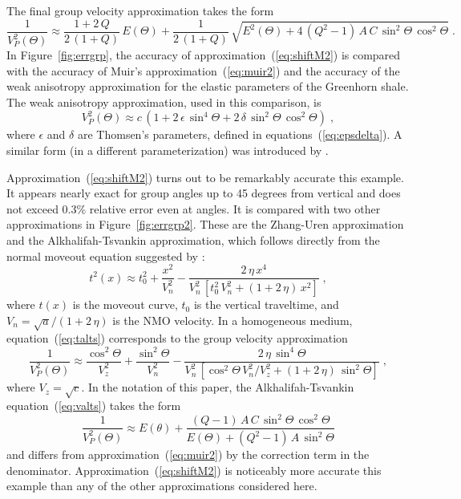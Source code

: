 The final group velocity approximation takes the form
\begin{equation}
  \label{eq:shiftM2}
  \frac{1}{V^2_{P}(\Theta)} \approx \frac{1+2\,Q}{2\,(1+Q)}\,E(\Theta) + 
\frac{1}{2\,(1+Q)}\,
\sqrt{E^2(\Theta) + 4\,(Q^2-1)\,A\,C\,\sin^2{\Theta}\,\cos^2{\Theta}}\;.
\end{equation}
In Figure~\ref{fig:errgrp}, the accuracy of approximation~(\ref{eq:shiftM2})
is compared with the accuracy of Muir's approximation~(\ref{eq:muir2}) and the
accuracy of the weak anisotropy approximation \cite[]{GEO51-10-19541966} for the
elastic parameters of the Greenhorn shale. The weak anisotropy approximation,
used in this comparison, is
\begin{equation}
  \label{eq:thoms2}
  V_P^2(\Theta) \approx c\,\left(1 + 2\,\epsilon\,\sin^4{\Theta} + 
    2\,\delta\,\sin^2{\Theta}\,\cos^2{\Theta}\right)\;,
\end{equation}
where $\epsilon$ and $\delta$ are Thomsen's parameters, defined in
equations~(\ref{eq:epsdelta}). A similar form (in a different
parameterization) was introduced by \cite{GEO54-12-15641574}.

Approximation~(\ref{eq:shiftM2}) turns out to be remarkably accurate
 this example. It appears nearly exact for group angles up to 45
degrees from vertical and does not exceed 0.3\% relative error even at
 angles. It is compared with two other approximations in
Figure~\ref{fig:errgrp2}. These are the Zhang-Uren approximation
\cite[]{SEG-2001-01060109} and the Alkhalifah-Tsvankin approximation, which
follows directly from the normal moveout equation suggested by
\cite{GEO60-05-15501566}:
\begin{equation}
  \label{eq:talts}
  t^2(x) \approx t_0^2 + \frac{x^2}{V_n^2} - 
  \frac{2\,\eta\,x^4}{V_n^2\,\left[t_0^2\,V_n^2 + (1+ 2\,\eta)\,x^2\right]}
\;,
\end{equation}
where $t(x)$ is the moveout curve, $t_0$ is the vertical traveltime, and $V_n
= \sqrt{a}/(1 + 2\,\eta)$ is the NMO velocity. In a homogeneous medium,
equation~(\ref{eq:talts}) corresponds to the group velocity approximation
\begin{equation}
  \label{eq:valts}
  \frac{1}{V_P^2(\Theta)} \approx \frac{\cos^2{\Theta}}{V_z^2} + 
  \frac{\sin^2{\Theta}}
  {V_n^2} - \frac{2\,\eta\,\sin^4{\Theta}}
  {V_n^2\,\left[\cos^2{\Theta}\,V_n^2/V_z^2 + 
  (1+ 2\,\eta)\,\sin^2{\Theta}\right]}
\;,
\end{equation}
where $V_z = \sqrt{c}$. In the notation of this paper, the Alkhalifah-Tsvankin
equation~(\ref{eq:valts}) takes the form
\begin{equation}
  \label{eq:valts2}
  \frac{1}{V_P^2(\Theta)} \approx E(\theta) + 
  \frac{(Q-1)\,A\,C\,
    \sin^2{\Theta}\,\cos^2{\Theta}}{E(\Theta) + (Q^2-1)\,A\,\sin^2{\Theta}}
\end{equation}
and differs from approximation~(\ref{eq:muir2}) by the correction term in the
denominator. Approximation~(\ref{eq:shiftM2}) is noticeably more accurate
 this example than any of the other approximations considered here.

